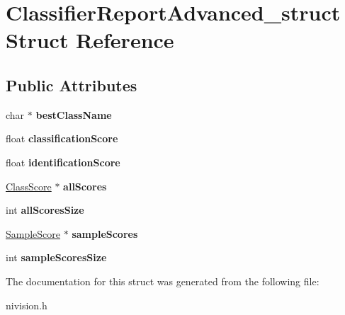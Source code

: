 \hypertarget{structClassifierReportAdvanced__struct}{
\section{ClassifierReportAdvanced\_\-struct Struct Reference}
\label{structClassifierReportAdvanced__struct}
}
\subsection*{Public Attributes}
\begin{DoxyCompactItemize}
\item 
\hypertarget{structClassifierReportAdvanced__struct_a76af2d8953598fc2719564d1897fd4bc}{
char $\ast$ {\bfseries bestClassName}}
\label{structClassifierReportAdvanced__struct_a76af2d8953598fc2719564d1897fd4bc}

\item 
\hypertarget{structClassifierReportAdvanced__struct_a74c031619c3d5a31592c5244a5db56b1}{
float {\bfseries classificationScore}}
\label{structClassifierReportAdvanced__struct_a74c031619c3d5a31592c5244a5db56b1}

\item 
\hypertarget{structClassifierReportAdvanced__struct_ae0baaf94e1c272077c4ca0efe3e1493b}{
float {\bfseries identificationScore}}
\label{structClassifierReportAdvanced__struct_ae0baaf94e1c272077c4ca0efe3e1493b}

\item 
\hypertarget{structClassifierReportAdvanced__struct_af25bc6d3b745247844a4204180baf060}{
\hyperlink{structClassScore__struct}{ClassScore} $\ast$ {\bfseries allScores}}
\label{structClassifierReportAdvanced__struct_af25bc6d3b745247844a4204180baf060}

\item 
\hypertarget{structClassifierReportAdvanced__struct_af590202c594d4296b1f43656408c4705}{
int {\bfseries allScoresSize}}
\label{structClassifierReportAdvanced__struct_af590202c594d4296b1f43656408c4705}

\item 
\hypertarget{structClassifierReportAdvanced__struct_a683513887c95ebee61cc921299d88196}{
\hyperlink{structSampleScore__struct}{SampleScore} $\ast$ {\bfseries sampleScores}}
\label{structClassifierReportAdvanced__struct_a683513887c95ebee61cc921299d88196}

\item 
\hypertarget{structClassifierReportAdvanced__struct_a894934d65afd8cd67d178c5f11665908}{
int {\bfseries sampleScoresSize}}
\label{structClassifierReportAdvanced__struct_a894934d65afd8cd67d178c5f11665908}

\end{DoxyCompactItemize}


The documentation for this struct was generated from the following file:\begin{DoxyCompactItemize}
\item 
nivision.h\end{DoxyCompactItemize}
